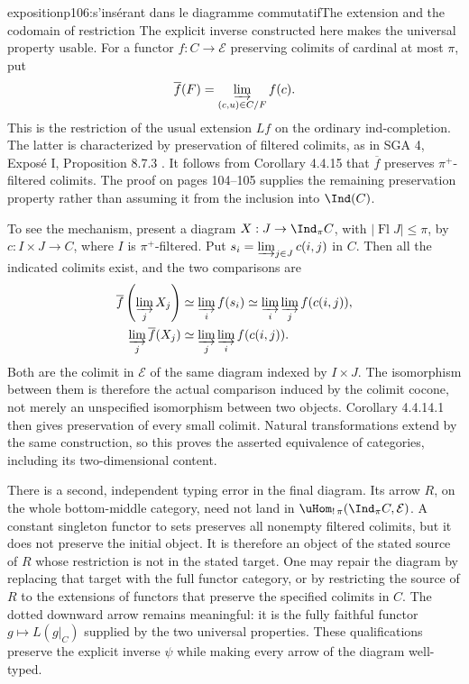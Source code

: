 \begin{dcomment}{exposition}{p106:s'insérant dans le diagramme commutatif}{The extension and the codomain of restriction}
The explicit inverse constructed here makes the universal property usable. For a functor $f:C\to\mathcal E$ preserving colimits of cardinal at most $\pi$, put
\[
\overline f(F)=\varinjlim_{(c,u)\in C/F}f(c).
\]
This is the restriction of the usual extension $Lf$ on the ordinary ind-completion. The latter is characterized by preservation of filtered colimits, as in SGA 4, Expos\'e I, Proposition 8.7.3 \citep{SGA4I1972}. It follows from Corollary 4.4.15 that $\overline f$ preserves $\pi^+$-filtered colimits. The proof on pages 104--105 supplies the remaining preservation property rather than assuming it from the inclusion into $\Ind(C)$.

To see the mechanism, present a diagram $X:J\to\Ind_\pi C$, with $|\operatorname{Fl}J|\leq\pi$, by $c:I\times J\to C$, where $I$ is $\pi^+$-filtered. Put $s_i=\varinjlim_{j\in J}c(i,j)$ in $C$. Then all the indicated colimits exist, and the two comparisons are
\[
\begin{aligned}
\overline f\left(\varinjlim_jX_j\right)
&\simeq\varinjlim_i f(s_i)
\simeq\varinjlim_i\varinjlim_j f(c(i,j)),\\
\varinjlim_j\overline f(X_j)
&\simeq\varinjlim_j\varinjlim_i f(c(i,j)).
\end{aligned}
\]
Both are the colimit in $\mathcal E$ of the same diagram indexed by $I\times J$. The isomorphism between them is therefore the actual comparison induced by the colimit cocone, not merely an unspecified isomorphism between two objects. Corollary 4.4.14.1 then gives preservation of every small colimit. Natural transformations extend by the same construction, so this proves the asserted equivalence of categories, including its two-dimensional content.

There is a second, independent typing error in the final diagram. Its arrow $R$, on the whole bottom-middle category, need not land in $\uHom_{!\,\pi}(\Ind_\pi C,\mathcal E)$. A constant singleton functor to sets preserves all nonempty filtered colimits, but it does not preserve the initial object. It is therefore an object of the stated source of $R$ whose restriction is not in the stated target. One may repair the diagram by replacing that target with the full functor category, or by restricting the source of $R$ to the extensions of functors that preserve the specified colimits in $C$. The dotted downward arrow remains meaningful: it is the fully faithful functor $g\mapsto L(g|_C)$ supplied by the two universal properties. These qualifications preserve the explicit inverse $\psi$ while making every arrow of the diagram well-typed.
\end{dcomment}

